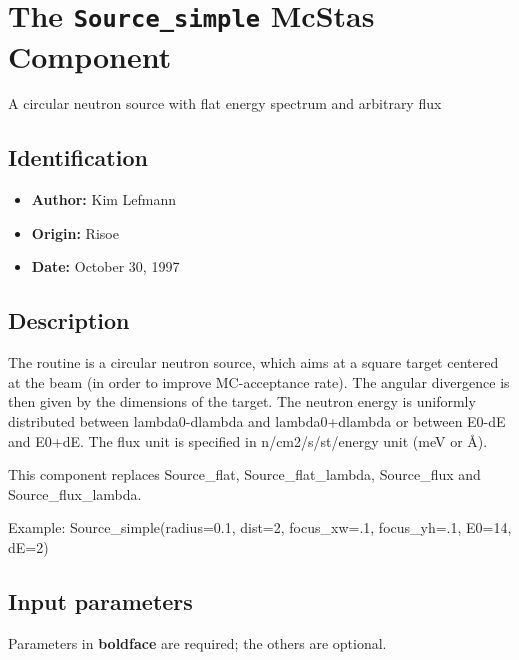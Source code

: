 \section{The \texttt{Source\_simple} McStas Component}
A circular neutron source with flat energy spectrum and arbitrary flux

\subsection*{Identification}
\begin{itemize}
  \item \textbf{Author:} Kim Lefmann
  \item \textbf{Origin:} Risoe
  \item \textbf{Date:} October 30, 1997
\end{itemize}

\subsection*{Description}
The routine is a circular neutron source, which aims at a square target centered at the beam (in order to improve MC-acceptance rate). The angular divergence is then given by the dimensions of the target. The neutron energy is uniformly distributed between lambda0-dlambda and lambda0+dlambda or between E0-dE and E0+dE. The flux unit is specified in n/cm2/s/st/energy unit (meV or \AA{}).

This component replaces Source\_flat, Source\_flat\_lambda, Source\_flux and Source\_flux\_lambda.

Example: Source\_simple(radius=0.1, dist=2, focus\_xw=.1, focus\_yh=.1, E0=14, dE=2)

\subsection*{Input parameters}
Parameters in \textbf{boldface} are required; the others are optional.

